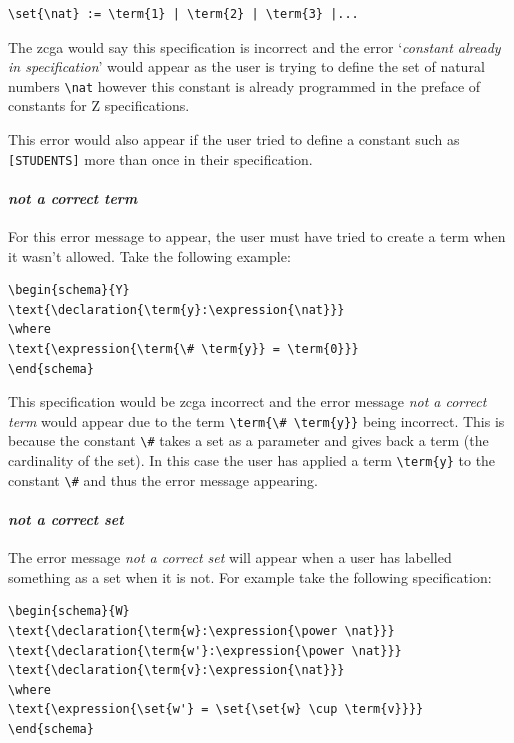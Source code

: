 \begin{exam}
\begin{verbatim}
\set{\nat} := \term{1} | \term{2} | \term{3} |...
\end{verbatim}
\end{exam}

The \gls{zcga} would say this specification is incorrect and the error
`\emph{constant already in specification}' would appear as the user is trying to
define the set of natural numbers \verb|\nat| however this constant is already
programmed in the preface of constants for Z specifications.

This error would also appear if the user tried to define a constant such as
\verb|[STUDENTS]| more  than once in their specification.

\paragraph{\emph{not a correct term}}

For this error message to appear, the user must have tried to create a term when
it wasn't allowed. Take the following example:

\begin{exam}
\begin{verbatim}       
\begin{schema}{Y}
\text{\declaration{\term{y}:\expression{\nat}}}
\where
\text{\expression{\term{\# \term{y}} = \term{0}}}
\end{schema}
\end{verbatim}
\end{exam}

This specification would be \gls{zcga} incorrect and the error message \emph{not
a correct term} would appear due to the term \verb|\term{\# \term{y}}| being
incorrect. This is because the constant \verb|\#| takes a set as a parameter and
gives back a term (the cardinality of the set). In this case the user has
applied a term \verb|\term{y}| to the constant \verb|\#| and thus the error
message appearing.

\paragraph{\emph{not a correct set}}

The error message \emph{not a correct set} will appear when a user has labelled
something as a set when it is not. For example take the following specification:

\begin{exam}
\begin{verbatim}       
\begin{schema}{W}
\text{\declaration{\term{w}:\expression{\power \nat}}}
\text{\declaration{\term{w'}:\expression{\power \nat}}}
\text{\declaration{\term{v}:\expression{\nat}}}
\where
\text{\expression{\set{w'} = \set{\set{w} \cup \term{v}}}}
\end{schema}
\end{verbatim}
\end{exam}

